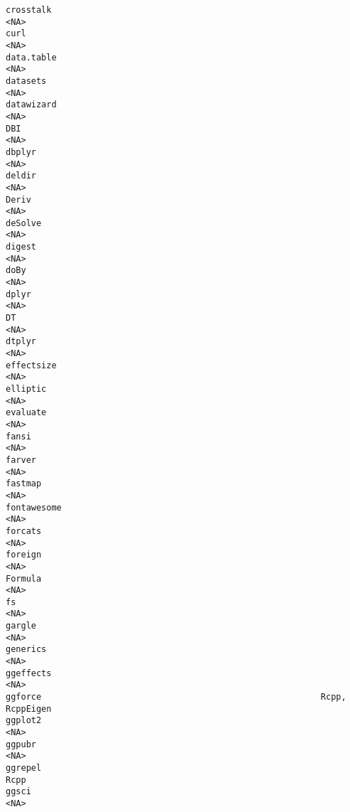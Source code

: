 \documentclass[
  letterpaper,
  DIV=11,
  numbers=noendperiod]{scrreprt}
\begin{document}
\begin{verbatim}
crosstalk                                                                <NA>
curl                                                                     <NA>
data.table                                                               <NA>
datasets                                                                 <NA>
datawizard                                                               <NA>
DBI                                                                      <NA>
dbplyr                                                                   <NA>
deldir                                                                   <NA>
Deriv                                                                    <NA>
deSolve                                                                  <NA>
digest                                                                   <NA>
doBy                                                                     <NA>
dplyr                                                                    <NA>
DT                                                                       <NA>
dtplyr                                                                   <NA>
effectsize                                                               <NA>
elliptic                                                                 <NA>
evaluate                                                                 <NA>
fansi                                                                    <NA>
farver                                                                   <NA>
fastmap                                                                  <NA>
fontawesome                                                              <NA>
forcats                                                                  <NA>
foreign                                                                  <NA>
Formula                                                                  <NA>
fs                                                                       <NA>
gargle                                                                   <NA>
generics                                                                 <NA>
ggeffects                                                                <NA>
ggforce                                                       Rcpp, RcppEigen
ggplot2                                                                  <NA>
ggpubr                                                                   <NA>
ggrepel                                                                  Rcpp
ggsci                                                                    <NA>

\end{verbatim}
\end{document}
